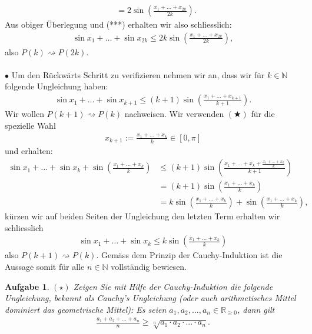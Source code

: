 \documentclass[a4paper, 20]{exam}
\newtheorem{ex}{Aufgabe}
\begin{document}
\begin{solution}
\begin{align*}
&= 2 \sin \left( \frac{x_1 + \dots + x_{2k}}{2k}\right).
\end{align*}
Aus obiger Überlegung und (***) erhalten wir also schliesslich:
\begin{align*}
\sin x_1 + \dots + \sin x_{2k} \leq 2k \sin \left( \frac{x_1 + \dots + x_{2k}}{2k}\right),
\end{align*}
also $P(k) \rightsquigarrow P(2k)$. 
\\
\\
$\bullet$ Um den Rückwärts Schritt zu verifizieren nehmen wir an, dass wir für $k \in \mathbb{N}$ folgende Ungleichung haben: 
\begin{align*}
\sin x_1 + \dots + \sin x_{k+1} \leq (k+1) \sin \left( \frac{x_1 + \dots + x_{k+1}}{k+1}\right). \tag{$\bigstar$}
\end{align*}
Wir wollen $P(k+1) \rightsquigarrow P(k)$ nachweisen. Wir verwenden $(\bigstar)$ für die spezielle Wahl 
\begin{align*}
x_{k+1}:= \frac{x_1 + \dots + x_k}{k} \in [0, \pi]
\end{align*}
und erhalten: 
\begin{align*}
\sin x_1 + \dots + \sin x_k + \sin \left( \frac{x_1 + \dots + x_k}{k}\right) &\leq (k+1) \sin \left( \frac{x_1 + \dots + x_k + \frac{x_1 + \dots + x_k}{k}}{k+1}\right) \\
& = (k+1) \sin \left( \frac{x_1 + \dots + x_k}{k}\right) \\
& = k \sin \left( \frac{x_1 + \dots + x_k}{k}\right) + \sin \left( \frac{x_1 + \dots + x_k}{k}\right),
\end{align*}
kürzen wir auf beiden Seiten der Ungleichung den letzten Term erhalten wir schliesslich 
\begin{align*}
\sin x_1 + \dots + \sin x_k \leq k \sin \left( \frac{x_1 + \dots + x_k}{k}\right)
\end{align*}
also $P(k+1) \rightsquigarrow P(k)$. Gemäss dem Prinzip der Cauchy-Induktion ist die Aussage somit für alle $n \in \mathbb{N}$ vollständig bewiesen. 
\end{solution}


\begin{ex}{$(\star)$} Zeigen Sie mit Hilfe der Cauchy-Induktion die folgende Ungleichung, bekannt als Cauchy's Ungleichung (oder auch arithmetisches Mittel dominiert das geometrische Mittel): Es seien $a_1, a_2, \dots , a_n \in \mathbb{R}_{ \geq 0}$, dann gilt
\begin{align*}
\frac{a_1 + a_2 + \dots + a_n}{n} \geq \sqrt[n]{a_1 \cdot a_2 \cdot ... \cdot a_n}.
\end{align*}
\end{ex}
\end{document}
